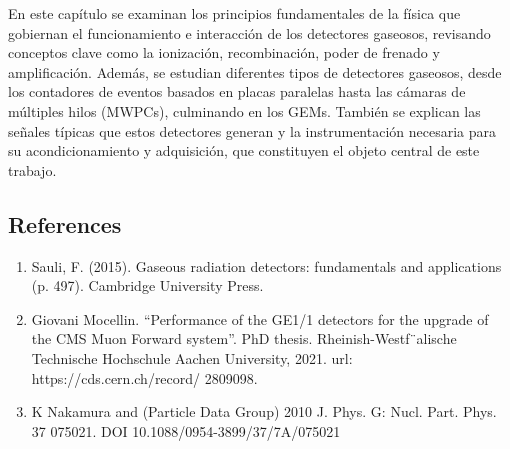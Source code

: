 \documentclass{article}
\begin{document}
\noindent En este capítulo se examinan los principios fundamentales de la física que gobiernan el funcionamiento e interacción de los detectores gaseosos, revisando conceptos clave como la ionización, recombinación, poder de frenado y amplificación. Además, se estudian diferentes tipos de detectores gaseosos, desde los contadores de eventos basados en placas paralelas hasta las cámaras de múltiples hilos (MWPCs), culminando en los GEMs. También se explican las señales típicas que estos detectores generan y la instrumentación necesaria para su acondicionamiento y adquisición, que constituyen el objeto central de este trabajo.


\subsection*{References}
\begin{enumerate}
    \item Sauli, F. (2015). Gaseous radiation detectors: fundamentals and applications (p. 497). Cambridge University Press.
    \item Giovani Mocellin. “Performance of the GE1/1 detectors for the upgrade of the
    CMS Muon Forward system”. PhD thesis. Rheinish-Westf¨alische Technische
    Hochschule Aachen University, 2021. url: https://cds.cern.ch/record/
    2809098.
    \item K Nakamura and (Particle Data Group) 2010 J. Phys. G: Nucl. Part. Phys. 37 075021. DOI 10.1088/0954-3899/37/7A/075021
\end{enumerate}




\end{document}
